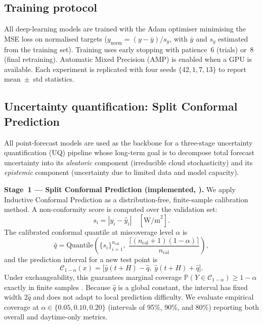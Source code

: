 \subsection{Training protocol}

All deep-learning models are trained with the Adam optimiser minimising the MSE
loss on normalised targets ($y_\text{norm} = (y - \bar{y}) / s_y$, with $\bar{y}$
and $s_y$ estimated from the training set). Training uses early stopping with
patience~6 (trials) or~8 (final retraining). Automatic Mixed Precision (AMP) is
enabled when a GPU is available. Each experiment is replicated with four seeds
$\{42, 1, 7, 13\}$ to report mean~$\pm$~std statistics.

\subsection{Uncertainty quantification: Split Conformal Prediction}
\label{ssec:uq}

All point-forecast models are used as the backbone for a three-stage uncertainty
quantification (UQ) pipeline whose long-term goal is to decompose total forecast
uncertainty into its \emph{aleatoric} component (irreducible cloud stochasticity)
and its \emph{epistemic} component (uncertainty due to limited data and model
capacity).

\textbf{Stage~1 --- Split Conformal Prediction (implemented, \cite{vovk2005,angelopoulos2023}).}
We apply Inductive Conformal Prediction as a distribution-free, finite-sample
calibration method.  A non-conformity score is computed over the validation set:
\begin{equation}
  s_i = |y_i - \hat{y}_i| \quad [\text{W/m}^2].
  \label{eq:score}
\end{equation}
The calibrated conformal quantile at miscoverage level $\alpha$ is
\begin{equation}
  \hat{q} = \mathrm{Quantile}\!\left(\{s_i\}_{i=1}^{n_\text{cal}},\;
    \frac{\lceil(n_\text{cal}+1)(1-\alpha)\rceil}{n_\text{cal}}\right),
  \label{eq:qhat}
\end{equation}
and the prediction interval for a new test point is
\begin{equation}
  \mathcal{C}_{1-\alpha}(x) = \bigl[\hat{y}(t+H)-\hat{q},\;\hat{y}(t+H)+\hat{q}\bigr].
  \label{eq:interval}
\end{equation}
Under exchangeability, this guarantees marginal coverage
$\mathbb{P}(Y \in \mathcal{C}_{1-\alpha}) \geq 1-\alpha$ exactly in finite samples
\cite{angelopoulos2023}.  Because $\hat{q}$ is a global constant, the interval
has fixed width $2\hat{q}$ and does not adapt to local prediction difficulty.
We evaluate empirical coverage at $\alpha \in \{0.05, 0.10, 0.20\}$ (intervals
of 95\%, 90\%, and 80\%) reporting both overall and daytime-only metrics.

